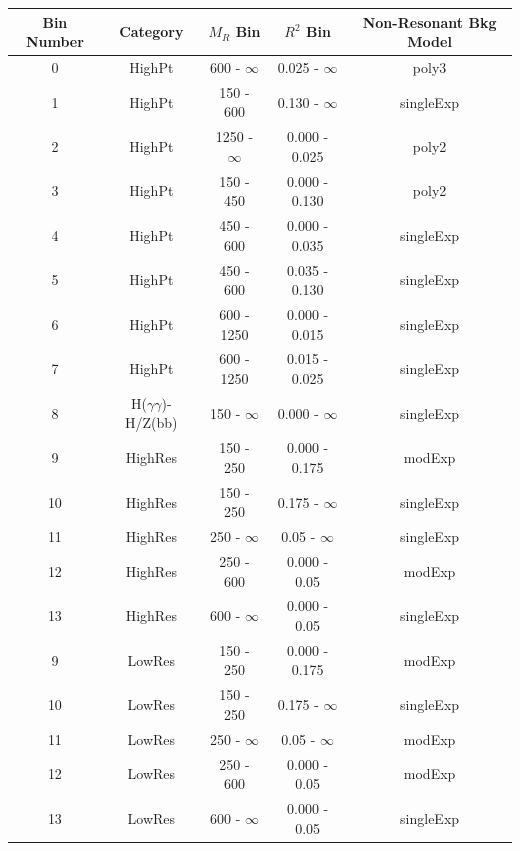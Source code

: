 \begin{table}[h]
\begin{center}
\begin{tabular}{|c|c|c|c|c|}
\hline
Bin Number & Category & $M_{R}$ Bin & $R^{2}$ Bin              & Non-Resonant Bkg Model    \\ 
\hline
0          & HighPt &  600  - $\infty$ &   0.025 - $\infty$   & poly3         \\
1          & HighPt &  150  - 600    &   0.130 - $\infty$     & singleExp     \\
2          & HighPt &  1250 - $\infty$ &   0.000 - 0.025      & poly2         \\
3          & HighPt &  150  - 450    &   0.000 - 0.130        & poly2         \\
4          & HighPt &  450  - 600    &   0.000 - 0.035        & singleExp     \\
5          & HighPt &  450  - 600    &   0.035 - 0.130        & singleExp     \\
6          & HighPt &  600  - 1250   &   0.000 - 0.015        & singleExp     \\
7          & HighPt &  600  - 1250   &   0.015 - 0.025        & singleExp     \\
\hline
8          & H($\gamma\gamma$)-H/Z(bb)   &  150 - $\infty$ &   0.000 - $\infty$    & singleExp     \\
\hline
9          & HighRes & 150 - 250     &   0.000 - 0.175        & modExp        \\
10         & HighRes & 150 - 250     &   0.175 - $\infty$     & singleExp     \\
11         & HighRes & 250 - $\infty$  &   0.05  - $\infty$   & singleExp     \\
12         & HighRes & 250 - 600     &   0.000 - 0.05         & modExp        \\
13         & HighRes & 600 - $\infty$  &   0.000 - 0.05       & singleExp     \\
\hline
9          & LowRes & 150 - 250     &   0.000 - 0.175         & modExp        \\
10         & LowRes & 150 - 250     &   0.175 - $\infty$      & singleExp     \\
11         & LowRes & 250 - $\infty$  &   0.05  - $\infty$    & modExp        \\
12         & LowRes & 250 - 600     &   0.000 - 0.05          & modExp        \\
13         & LowRes & 600 - $\infty$  &   0.000 - 0.05        & singleExp     \\
\hline
\end{tabular}
\label{tab:binSummary}
\end{center}
\end{table}


